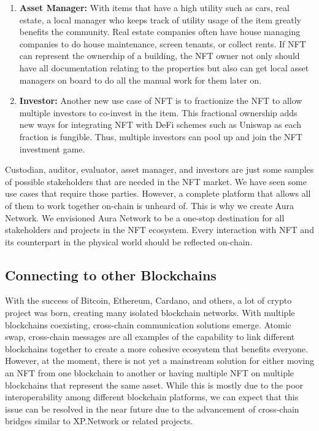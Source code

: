 \documentclass[12pt]{article}
\begin{document}
\begin{enumerate}
    \item \textbf{Asset Manager:} With items that have a high utility such as cars, real estate, a local manager who keeps track of utility usage of the item greatly benefits the community. Real estate companies often have house managing companies to do house maintenance, screen tenants, or collect rents. If NFT can represent the ownership of a building, the NFT owner not only should have all documentation relating to the properties but also can get local asset managers on board to do all the manual work for them later on. 
    
    \item \textbf{Investor:} Another new use case of NFT is to fractionize the NFT to allow multiple investors to co-invest in the item. This fractional ownership adds new ways for integrating NFT with DeFi schemes such as Uniswap as each fraction is fungible. Thus, multiple investors can pool up and join the NFT investment game.
\end{enumerate}

Custodian, auditor, evaluator, asset manager, and investors are just some samples of possible stakeholders that are needed in the NFT market. We have seen some use cases that require those parties. However, a complete platform that allows all of them to work together on-chain is unheard of. This is why we create Aura Network. We envisioned Aura Network to be a one-stop destination for all stakeholders and projects in the NFT ecosystem. Every interaction with NFT and its counterpart in the physical world should be reflected on-chain.

\subsection{Connecting to other Blockchains}

With the success of Bitcoin, Ethereum, Cardano, and others, a lot of crypto project was born, creating many isolated blockchain networks. With multiple blockchains coexisting, cross-chain communication solutions emerge. Atomic swap, cross-chain messages are all examples of the capability to link different blockchains together to create a more cohesive ecosystem that benefits everyone. However, at the moment, there is not yet a mainstream solution for either moving an NFT from one blockchain to another or having multiple NFT on multiple blockchains that represent the same asset. While this is mostly due to the poor interoperability among different blockchain platforms, we can expect that this issue can be resolved in the near future due to the advancement of cross-chain bridges similar to XP.Network \cite{xpnetwork} or related projects. 
\end{document}
